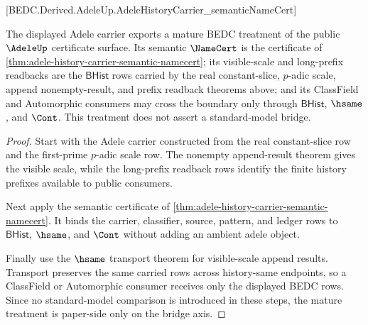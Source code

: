 [BEDC.Derived.AdeleUp.AdeleHistoryCarrier\_semanticNameCert]

\begin{theorem}
\label{thm:adele-mature-treatment}
The displayed Adele carrier exports a mature BEDC treatment of the public
$\AdeleUp$ certificate surface. Its semantic $\NameCert$ is the certificate of
\autoref{thm:adele-history-carrier-semantic-namecert}; its visible-scale and
long-prefix readbacks are the $\mathsf{BHist}$ rows carried by the real
constant-slice, $p$-adic scale, append nonempty-result, and prefix readback
theorems above; and its ClassField and Automorphic consumers may cross the
boundary only through $\mathsf{BHist}$, $\hsame$, and $\Cont$. This treatment
does not assert a standard-model bridge.
\end{theorem}
\begin{proof}
Start with the Adele carrier constructed from the real constant-slice row and
the first-prime $p$-adic scale row. The nonempty append-result theorem gives
the visible scale, while the long-prefix readback rows identify the finite
history prefixes available to public consumers.

Next apply the semantic certificate of
\autoref{thm:adele-history-carrier-semantic-namecert}. It binds the carrier,
classifier, source, pattern, and ledger rows to $\mathsf{BHist}$, $\hsame$,
and $\Cont$ without adding an ambient adele object.

Finally use the $\hsame$ transport theorem for visible-scale append results.
Transport preserves the same carried rows across history-same endpoints, so a
ClassField or Automorphic consumer receives only the displayed BEDC rows. Since
no standard-model comparison is introduced in these steps, the mature treatment
is paper-side only on the bridge axis.
\end{proof}

